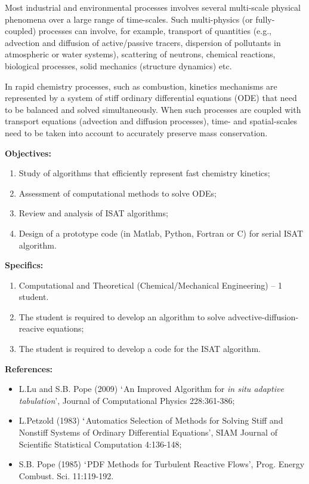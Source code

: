 \documentclass[12pts,a4paper,amsmath,amssymb,floatfix]{article}%
\newcommand{\Chem}{Chemical/Mechanical Engineering}
\begin{document}
\begin{enumerate}[label=\bfseries Project: \arabic*:]
Most industrial and environmental processes involves several multi-scale physical phenomena over a large range of time-scales. Such multi-physics (or fully-coupled) processes can involve, for example, transport of quantities (e.g., advection and diffusion of active/passive tracers, dispersion of pollutants in atmospheric or water systems), scattering of neutrons, chemical reactions, biological processes, solid mechanics (structure dynamics) etc. 

In rapid chemistry processes, such as combustion, kinetics mechanisms are represented by a system of stiff ordinary differential equations (ODE) that need to be balanced and solved simultaneously. When such processes are coupled with transport equations (advection and diffusion processes), time- and spatial-scales need to be taken into account to accurately preserve mass conservation. 

\noindent
{\bf Objectives:}
\begin{enumerate}
\item Study of algorithms that efficiently represent fast chemistry kinetics;
\item Assessment of computational methods to solve ODEs;
\item Review and analysis of ISAT algorithms;
\item Design of a prototype code (in Matlab, Python, Fortran or C) for serial ISAT algorithm.
\end{enumerate} 
 
\noindent
{\bf Specifics:} 
\begin{enumerate}
\item Computational and Theoretical (\Chem) -- 1 student.
\item The student is required to develop an algorithm to solve advective-diffusion-reacive equations;
\item The student is required to develop a code for the ISAT algorithm.
\end{enumerate}

\noindent
{\bf References:}
\begin{itemize}
\item L.Lu and S.B. Pope (2009) $\lq$An Improved Algorithm for {\it in situ adaptive tabulation}’, Journal of Computational Physics 228:361-386;
\item L.Petzold (1983) $\lq$Automatics Selection of Methods for Solving Stiff and Nonstiff Systems of Ordinary Differential Equations', SIAM Journal of Scientific Statistical Computation 4:136-148;
\item S.B. Pope (1985)  $\lq$PDF Methods for Turbulent Reactive Flows',  Prog. Energy Combust. Sci. 11:119-192.
\end{itemize}

\clearpage





\end{enumerate}
\end{document}
